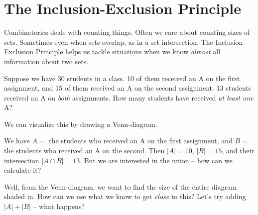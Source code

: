 \documentclass[main.tex]{subfiles}
\begin{document}
\section{The Inclusion-Exclusion Principle}

Combinatorics deals with counting things. Often we care about counting sizes of sets. Sometimes even when sets overlap, as in a set intersection. The Inclusion-Exclusion Principle helps us tackle situations when we know \textit{almost} all information about two sets.

\begin{example}
	Suppose we have 30 students in a class. 10 of them received an A on the first assignment, and 15 of them received an A on the second assignment. 13 students received an A on \textit{both} assignments. How many students have received \textit{at least one} A?
	
	We can visualize this by drawing a Venn-diagram.
	
	\begin{center}
	\end{center}
	
	We have \(A = \) the students who received an A on the first assignment, and \(B = \) the students who received an A on the second. Then \(|A| = 10\), \(|B| = 15\), and their intersection \(|A \cap B| = 13\). But we are interested in the union -- how can we calculate it?
	
	Well, from the Venn-diagram, we want to find the size of the entire diagram shaded in. How can we use what we know to get \textit{close} to this? Let's try adding \(|A| + |B|\) -- what happens?
	
	\begin{center}
	\end{center}
	

\end{example}
\end{document}
